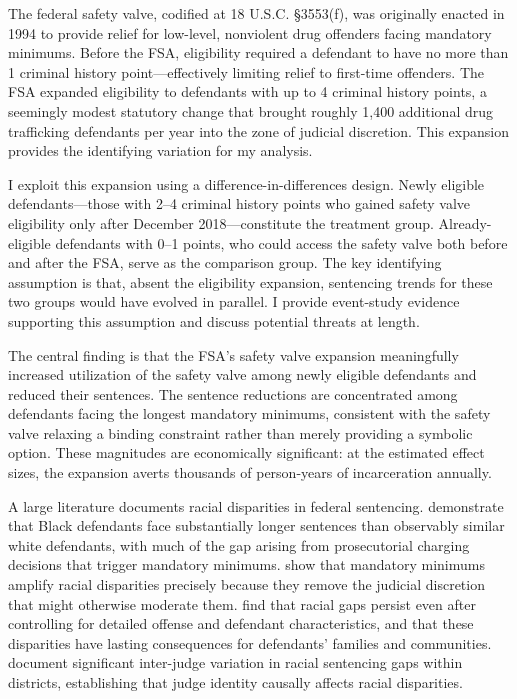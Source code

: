 \documentclass[12pt]{article}
\begin{document}
The federal safety valve, codified at 18 U.S.C. \S 3553(f), was originally enacted in 1994 to provide relief for low-level, nonviolent drug offenders facing mandatory minimums. Before the FSA, eligibility required a defendant to have no more than 1 criminal history point---effectively limiting relief to first-time offenders. The FSA expanded eligibility to defendants with up to 4 criminal history points, a seemingly modest statutory change that brought roughly 1,400 additional drug trafficking defendants per year into the zone of judicial discretion. This expansion provides the identifying variation for my analysis.

I exploit this expansion using a difference-in-differences design. Newly eligible defendants---those with 2--4 criminal history points who gained safety valve eligibility only after December 2018---constitute the treatment group. Already-eligible defendants with 0--1 points, who could access the safety valve both before and after the FSA, serve as the comparison group. The key identifying assumption is that, absent the eligibility expansion, sentencing trends for these two groups would have evolved in parallel. I provide event-study evidence supporting this assumption and discuss potential threats at length.

The central finding is that the FSA's safety valve expansion meaningfully increased utilization of the safety valve among newly eligible defendants and reduced their sentences. The sentence reductions are concentrated among defendants facing the longest mandatory minimums, consistent with the safety valve relaxing a binding constraint rather than merely providing a symbolic option. These magnitudes are economically significant: at the estimated effect sizes, the expansion averts thousands of person-years of incarceration annually.

A large literature documents racial disparities in federal sentencing. \citet{rehavi2014racial} demonstrate that Black defendants face substantially longer sentences than observably similar white defendants, with much of the gap arising from prosecutorial charging decisions that trigger mandatory minimums. \citet{starr2013mandatory} show that mandatory minimums amplify racial disparities precisely because they remove the judicial discretion that might otherwise moderate them. \citet{dobbie2018effects} find that racial gaps persist even after controlling for detailed offense and defendant characteristics, and that these disparities have lasting consequences for defendants' families and communities. \citet{abrams2012judges} document significant inter-judge variation in racial sentencing gaps within districts, establishing that judge identity causally affects racial disparities.
\end{document}
